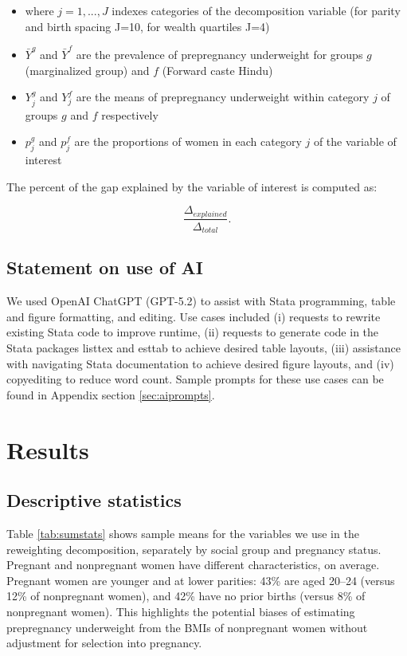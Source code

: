\documentclass[12pt]{article}
\begin{document}
\begin{itemize}
    \item where \(j=1,...,J\) indexes categories of the decomposition variable (for parity and birth spacing J=10, for wealth quartiles J=4)
    \item \( \bar Y^g\) and \(\bar Y^f\) are the prevalence of prepregnancy underweight for groups \(g\) (marginalized group) and \(f\) (Forward caste Hindu)
    \item \(Y_j^g\) and \(Y_j^f\) are the means of prepregnancy underweight within category \(j\) of groups \(g\) and \(f\) respectively
    \item \(p_j^g\) and \(p_j^f\) are the proportions of women in each category \(j\) of the variable of interest
    
\end{itemize}

The percent of the gap explained by the variable of interest is computed as:

\begin{equation} \label{eq_pct}
    \frac{\Delta_{explained}}{\Delta_{total}}.
\end{equation}

\subsection{Statement on use of AI}\label{sec:AIuse}

We used OpenAI ChatGPT (GPT-5.2) to assist with Stata programming, table and figure formatting, and editing. Use cases included (i) requests to rewrite existing Stata code to improve runtime, (ii) requests to generate code in the Stata packages listtex and esttab to achieve desired table layouts, (iii) assistance with navigating Stata documentation to achieve desired figure layouts, and (iv) copyediting to reduce word count.  Sample prompts for these use cases can be found in Appendix section \ref{sec:aiprompts}.

\section{Results}

\subsection*{Descriptive statistics}

Table \ref{tab:sumstats} shows sample means for the variables we use in the reweighting decomposition, separately by social group and pregnancy status. Pregnant and nonpregnant women have different characteristics, on average. Pregnant women are younger and at lower parities: 43\% are aged 20–24 (versus 12\% of nonpregnant women), and 42\% have no prior births (versus 8\% of nonpregnant women). This highlights the potential biases of estimating prepregnancy underweight from the BMIs of nonpregnant women without adjustment for selection into pregnancy.
\end{document}
